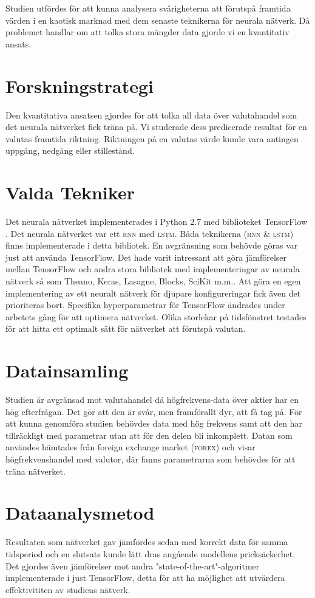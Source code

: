 Studien utfördes för att kunna analysera svårigheterna att förutspå framtida
värden i en kaotisk marknad med dem senaste teknikerna för neurala nätverk. Då
problemet handlar om att tolka stora mängder data gjorde vi en kvantitativ
ansats.

\section{Forskningstrategi}
Den kvantitativa ansatsen gjordes för att tolka all data över valutahandel som
det neurala nätverket fick träna på. Vi studerade dess predicerade resultat för
en valutas framtida riktning. Riktningen på en valutas värde kunde vara antingen
uppgång, nedgång eller stillestånd.

\section{Valda Tekniker}
Det neurala nätverket implementerades i Python 2.7 med biblioteket TensorFlow
\citep{tensorflow2015-whitepaper}. Det neurala nätverket var ett \textsc{rnn} 
med \textsc{lstm}. Båda teknikerna \textsc{(rnn \& lstm)} finns implementerade i 
detta bibliotek. En avgränsning som behövde göras var just att använda TensorFlow.
Det hade varit intressant att
göra jämförelser mellan TensorFlow och andra stora bibliotek med
implementeringar av neurala nätverk så som Theano, Keras, Lasagne, Blocks,
SciKit m.m.. Att göra en egen implementering av ett neuralt nätverk för djupare
konfigureringar fick även det prioriteras bort. Specifika hyperparametrar för
TensorFlow ändrades under arbetets gång för att optimera nätverket. Olika
storlekar på tidsfönstret testades för att hitta ett optimalt sätt för nätverket
att förutspå valutan.

\section{Datainsamling}
Studien är avgränsad mot valutahandel då högfrekvens-data över aktier har en hög
efterfrågan. Det gör att den är svår, men framförallt dyr, att få tag på. För
att kunna genomföra studien behövdes data med hög frekvens samt att den har
tillräckligt med parametrar utan att för den delen bli inkomplett. Datan som
användes hämtades från foreign exchange market \textsc{(forex)} och visar
högfrekvenshandel med valutor, där fanns parametrarna som behövdes för att träna
nätverket.

\section{Dataanalysmetod}
Resultaten som nätverket gav jämfördes sedan med korrekt data för samma
tidsperiod och en slutsats kunde lätt dras angående modellens
pricksäckerhet. Det gjordes även jämförelser mot andra
"state-of-the-art"-algoritmer implementerade i just TensorFlow, detta för att ha
möjlighet att utvärdera effektivititen av studiens nätverk.
